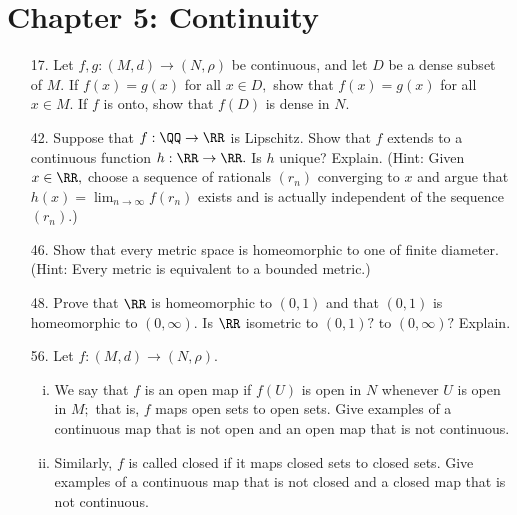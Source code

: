 \documentclass{article}
\begin{document}
\section*{Chapter 5: Continuity}

\begin{itemize}
	\item[17.] Let $f, g:(M, d)\to(N, \rho)$ be continuous, and let $D$ be a dense subset of $M.$ If $f(x)=g(x)$ for all $x\in D,$ show that $f(x)=g(x)$ for all $x\in M.$ If $f$ is onto, show that $f(D)$ is dense in $N.$

	\item[42.] Suppose that $f:\QQ\to\RR$ is Lipschitz. Show that $f$ extends to a continuous function $h:\RR\to\RR.$ Is $h$ unique? Explain. (Hint: Given $x\in\RR,$ choose a sequence of rationals $(r_n)$ converging to $x$ and argue that $h(x)=\lim_{n\to\infty} f(r_n)$ exists and is actually independent of the sequence $(r_n).$)

	\item[46.] Show that every metric space is homeomorphic to one of finite diameter. (Hint: Every metric is equivalent to a bounded metric.)

	\item[48.] Prove that $\RR$ is homeomorphic to $(0, 1)$ and that $(0, 1)$ is homeomorphic to $(0, \infty).$ Is $\RR$ isometric to $(0, 1)?$ to $(0, \infty)?$ Explain.

	\item[56.] Let $f:(M, d)\to (N, \rho).$
		\begin{enumerate}[(i)]
			\item We say that $f$ is an open map if $f(U)$ is open in $N$ whenever $U$ is open in $M;$ that is, $f$ maps open sets to open sets. Give examples of a continuous map that is not open and an open map that is not continuous.

			\item Similarly, $f$ is called closed if it maps closed sets to closed sets. Give examples of a continuous map that is not closed and a closed map that is not continuous. 
				
		\end{enumerate}
		
\end{itemize}
\end{document}
